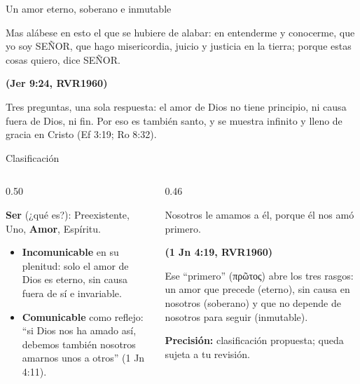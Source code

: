 \documentclass[hyperref={bookmarks=false},aspectratio=169]{beamer}
\newcommand{\grc}[1]{\foreignlanguage{ancientgreek}{#1}}
\newcommand{\SENOR}{S{\fontsize{0.78em}{1em}\selectfont EÑOR}}
\newcommand{\fuente}[1]{\par\hfill{\upshape\bfseries\footnotesize\textcolor{azul}{#1}}}
\newcommand{\destacar}[1]{\textbf{\textcolor{azul}{#1}}}
\newcommand{\precision}[1]{{\footnotesize\color{gris}\textbf{Precisión:} #1}}
\begin{document}
\begin{frame}{Un amor eterno, soberano e inmutable}
\centering
{}\par\medskip
\begin{cita}Mas alábese en esto el que se hubiere de alabar: en entenderme y conocerme, que yo soy \SENOR, que hago misericordia, juicio y justicia en la tierra; porque estas cosas quiero, dice \SENOR.\fuente{(Jer 9:24, RVR1960)}\end{cita}
\scriptsize Tres preguntas, una sola respuesta: el amor de Dios no tiene principio, ni causa fuera de Dios, ni fin. Por eso es también santo, y se muestra infinito y lleno de gracia en Cristo (Ef 3:19; Ro 8:32).
\end{frame}

\begin{frame}{Clasificación}
\begin{columns}[c,onlytextwidth]
\begin{column}{0.50\textwidth}
\begin{tcolorbox}[colback=papiro,colframe=dorado,boxrule=1.2pt,arc=3pt]
\small\textbf{\textcolor{azul}{Ser}} (¿qué es?): Preexistente, Uno, \destacar{Amor}, Espíritu.
\end{tcolorbox}
\small\begin{itemize}
\item \textbf{Incomunicable} en su plenitud: solo el amor de Dios es eterno, sin causa fuera de sí e invariable.
\item \textbf{Comunicable} como reflejo: ``si Dios nos ha amado así, debemos también nosotros amarnos unos a otros'' (1 Jn 4:11).
\end{itemize}
\end{column}
\begin{column}{0.46\textwidth}
\begin{cita}Nosotros le amamos a él, porque él nos amó primero.\fuente{(1 Jn 4:19, RVR1960)}\end{cita}
\small Ese ``primero'' (\grc{πρῶτος}) abre los tres rasgos: un amor que precede (eterno), sin causa en nosotros (soberano) y que no depende de nosotros para seguir (inmutable).\par\medskip
\precision{clasificación propuesta; queda sujeta a tu revisión.}
\end{column}
\end{columns}
\end{frame}
\end{document}
